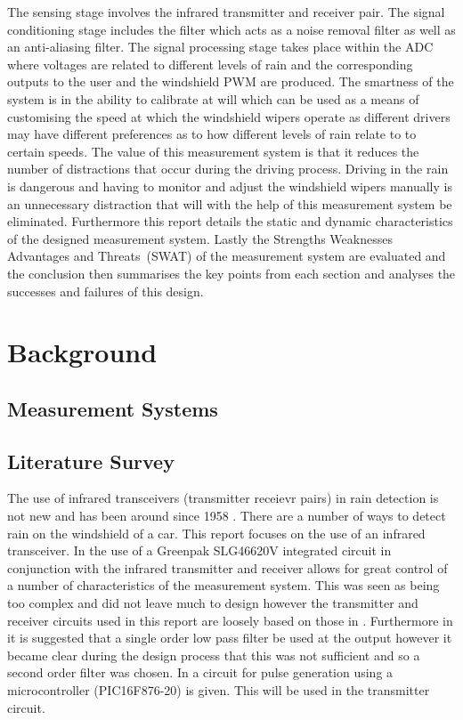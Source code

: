 \documentclass[conference, 11pt]{IEEEtran}
\begin{document}
The sensing stage involves the infrared transmitter and receiver pair. The signal conditioning stage includes the filter which acts as a noise removal filter as well as an anti-aliasing filter. The signal processing stage takes place within the ADC where voltages are related to different levels of rain and the corresponding outputs to the user and the windshield PWM are produced. The smartness of the system is in the ability to calibrate at will which can be used as a means of customising the speed at which the windshield wipers operate as different drivers may have different preferences as to how different levels of rain relate to to certain speeds. The value of this measurement system is that it reduces the number of distractions that occur during the driving process. Driving in the rain is dangerous and having to monitor and adjust the windshield wipers manually is an unnecessary distraction that will with the help of this measurement system be eliminated. Furthermore this report details the static and dynamic characteristics of the designed measurement system. Lastly the Strengths Weaknesses Advantages and Threats~(SWAT) of the measurement system are evaluated and the conclusion then summarises the key points from each section and analyses the successes and failures of this design. 

\section{Background}
	
	
	
\subsection{Measurement Systems}


	
\subsection{Literature Survey}
The use of infrared transceivers (transmitter receievr pairs) in rain detection is not new and has been around since 1958 \cite{SENS}. There are a number of ways to detect rain on the windshield of a car. This report focuses on the use of an infrared transceiver. In \cite{NOTE} the use of a Greenpak SLG46620V integrated circuit in conjunction with the infrared transmitter and receiver allows for great control of a number of characteristics of the measurement system. This was seen as being too complex and did not leave much to design however the transmitter and receiver circuits used in this report are loosely based on those in \cite{NOTE}. 
Furthermore in \cite{NOTE} it is suggested that a single order low pass filter be used at the output however it became clear during the design process that this was not sufficient and so a second order filter was chosen. In
\cite{PULSE} a circuit for pulse generation using a microcontroller (PIC16F876-20) is given. This will be used in the transmitter circuit. 
\end{document}
